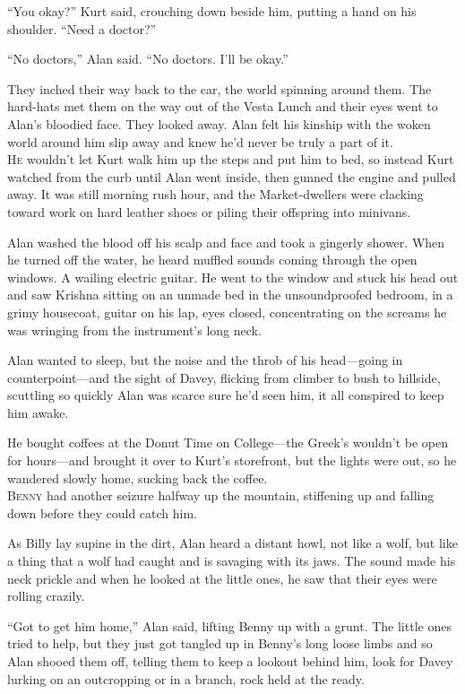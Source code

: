 ``You okay?'' Kurt said, crouching down beside him, putting a hand on
his shoulder.  ``Need a doctor?''

``No doctors,'' Alan said.  ``No doctors.  I'll be okay.''

They inched their way back to the car, the world spinning around them. 
The hard-hats met them on the way out of the Vesta Lunch and their
eyes went to Alan's bloodied face.  They looked away.  Alan felt his
kinship with the woken world around him slip away and knew he'd never
be truly a part of it.
\\
\lettrine[lines=3, lhang=.5, nindent=0pt, findent=2pt]{H}{e} wouldn't let Kurt walk him up the steps and put him to bed, so
instead Kurt watched from the curb until Alan went inside, then gunned
the engine and pulled away.  It was still morning rush hour, and the
Market-dwellers were clacking toward work on hard leather shoes or
piling their offspring into minivans.

Alan washed the blood off his scalp and face and took a gingerly
shower.  When he turned off the water, he heard muffled sounds coming
through the open windows.  A wailing electric guitar.  He went to the
window and stuck his head out and saw Krishna sitting on an unmade bed
in the unsoundproofed bedroom, in a grimy housecoat, guitar on his
lap, eyes closed, concentrating on the screams he was wringing from
the instrument's long neck.

Alan wanted to sleep, but the noise and the throb of his head---going
in counterpoint---and the sight of Davey, flicking from climber to
bush to hillside, scuttling so quickly Alan was scarce sure he'd seen
him, it all conspired to keep him awake.

He bought coffees at the Donut Time on College---the Greek's wouldn't
be open for hours---and brought it over to Kurt's storefront, but the
lights were out, so he wandered slowly home, sucking back the coffee.
\\
\lettrine[lines=3, lhang=.5, nindent=0pt, findent=2pt]{B}{enny} had another seizure halfway up the mountain, stiffening up and
falling down before they could catch him.

As Billy lay supine in the dirt, Alan heard a distant howl, not like a
wolf, but like a thing that a wolf had caught and is savaging with its
jaws.  The sound made his neck prickle and when he looked at the
little ones, he saw that their eyes were rolling crazily.

``Got to get him home,'' Alan said, lifting Benny up with a grunt. 
The little ones tried to help, but they just got tangled up in Benny's
long loose limbs and so Alan shooed them off, telling them to keep a
lookout behind him, look for Davey lurking on an outcropping or in a
branch, rock held at the ready.

